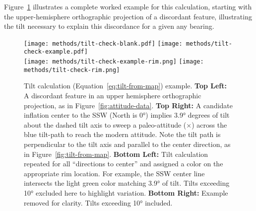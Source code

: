 Figure~\ref{fig:tilt-example} illustrates a complete worked example for this calculation, starting with the upper-hemisphere orthographic projection of a discordant feature, illustrating the tilt necessary to explain this discordance for a given any \acs{bearing}.
\begin{figure}
    \vspace{-19pt}
    \texttt{[image: methods/tilt-check-blank.pdf]}%
    \texttt{[image: methods/tilt-check-example.pdf]}\\
    \texttt{[image: methods/tilt-check-example-rim.png]}%
    \texttt{[image: methods/tilt-check-rim.png]}%
    \caption[Tilt calculation example]{Tilt calculation (Equation~\ref{eq:tilt-from-map}) example. \textbf{Top Left:} A discordant feature in an upper hemisphere orthographic projection, as in Figure~\ref{fig:attitude-data}. \textbf{Top Right:} A candidate inflation center to the SSW (North is \ang{0}) implies \ang{+3.9} degrees of tilt about the dashed tilt axis to sweep a paleo-attitude ($\times$) across the blue tilt-path to reach the modern attitude. Note the tilt path is perpendicular to the tilt axis and parallel to the center direction, as in Figure~\ref{fig:tilt-from-map}. \textbf{Bottom Left:} Tilt calculation repeated for all ``directions to center'' and assigned a color on the appropriate rim location. For example, the SSW center line intersects the light green color matching \ang{3.9} of tilt. Tilts exceeding \ang{10} excluded here to highlight variation. \textbf{Bottom Right:} Example removed for clarity. Tilts exceeding \ang{10} included.}
    \label{fig:tilt-example}
\end{figure}


